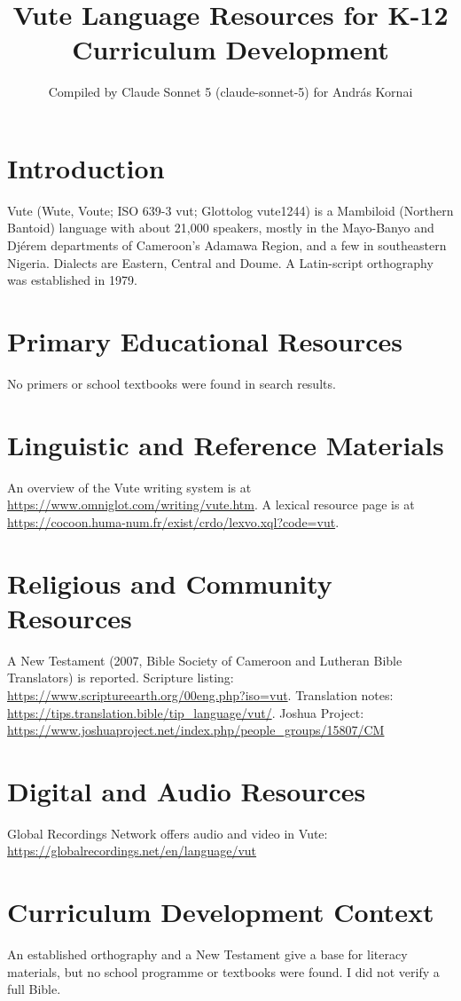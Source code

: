 \documentclass[12pt]{article}
\title{Vute Language Resources for K-12 Curriculum Development}
\author{Compiled by Claude Sonnet 5 (claude-sonnet-5) for Andr\'as Kornai}
\date{}
\begin{document}
\maketitle
\section{Introduction}
Vute (Wute, Voute; ISO 639-3 vut; Glottolog vute1244) is a Mambiloid (Northern Bantoid) language with about 21,000 speakers, mostly in the Mayo-Banyo and Dj\'erem departments of Cameroon's Adamawa Region, and a few in southeastern Nigeria. Dialects are Eastern, Central and Doume. A Latin-script orthography was established in 1979.
\section{Primary Educational Resources}
No primers or school textbooks were found in search results.
\section{Linguistic and Reference Materials}
An overview of the Vute writing system is at \url{https://www.omniglot.com/writing/vute.htm}. A lexical resource page is at \url{https://cocoon.huma-num.fr/exist/crdo/lexvo.xql?code=vut}.
\section{Religious and Community Resources}
A New Testament (2007, Bible Society of Cameroon and Lutheran Bible Translators) is reported. Scripture listing: \url{https://www.scriptureearth.org/00eng.php?iso=vut}. Translation notes: \url{https://tips.translation.bible/tip_language/vut/}. Joshua Project: \url{https://www.joshuaproject.net/index.php/people_groups/15807/CM}
\section{Digital and Audio Resources}
Global Recordings Network offers audio and video in Vute: \url{https://globalrecordings.net/en/language/vut}
\section{Curriculum Development Context}
An established orthography and a New Testament give a base for literacy materials, but no school programme or textbooks were found. I did not verify a full Bible.
\end{document}
